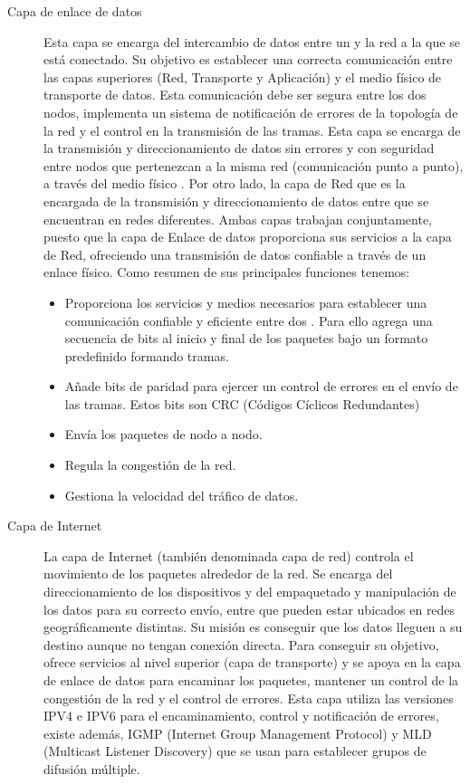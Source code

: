 \begin{description}
\item[Capa de enlace de datos \cite{CapaEnlaceDatos}] 
Esta capa se encarga del intercambio de datos entre un  y la red a la que se está conectado. Su objetivo es establecer una correcta comunicación entre las capas superiores (Red, Transporte y Aplicación) y el medio físico de transporte de datos. Esta comunicación debe ser segura entre los dos nodos, implementa un sistema de notificación de errores de la topología de la red y el control en la transmisión de las tramas. 
Esta capa se encarga de la transmisión y direccionamiento de datos sin errores y con seguridad entre nodos que pertenezcan a la misma red (comunicación punto a punto), a través del medio físico . Por otro lado, la capa de Red que es la encargada de la transmisión y direccionamiento de datos entre  que se encuentran en redes diferentes. Ambas capas trabajan conjuntamente, puesto que la capa de Enlace de datos proporciona sus servicios a la capa de Red, ofreciendo una transmisión de datos confiable a través de un enlace físico.
Como resumen de sus principales funciones tenemos:
\begin{itemize}
\item Proporciona los servicios y medios necesarios para establecer una comunicación confiable y eficiente entre dos . Para ello agrega una secuencia de bits al inicio y final de los paquetes bajo un formato predefinido formando tramas.
\item Añade bits de paridad para ejercer un control de errores en el envío de las tramas. Estos bits son CRC (Códigos Cíclicos Redundantes)
\item Envía los paquetes de nodo a nodo.
\item Regula la congestión de la red.
\item Gestiona la velocidad del tráfico de datos.
\end{itemize}

\item[Capa de Internet]
La capa de Internet \cite{lopezQuesadaRED} (también denominada capa de red) controla el movimiento de los paquetes alrededor de la red. Se encarga del direccionamiento de los dispositivos y del empaquetado y manipulación de los datos para su correcto envío, entre  que pueden estar ubicados en redes geográficamente distintas. Su misión es conseguir que los datos lleguen a su destino aunque no tengan conexión directa. Para conseguir su objetivo, ofrece servicios al nivel superior (capa de transporte) y se apoya en la capa de enlace de datos para encaminar los paquetes, mantener un control de la congestión de la red y el control de errores. 
Esta capa utiliza las versiones IPV4 e IPV6 para el encaminamiento, control y notificación de errores, existe además, IGMP (Internet Group Management Protocol) y MLD (Multicast Listener Discovery) que se usan para establecer grupos de difusión múltiple.


\end{description}
